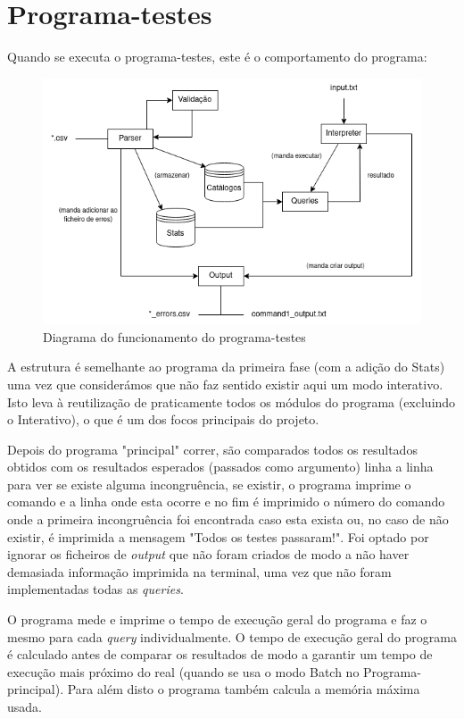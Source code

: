 \documentclass[12pt,a4paper]{report}
\begin{document}
    
    \chapter{Programa-testes}

    Quando se executa o programa-testes, este é o comportamento do programa:    
    
    \begin{figure}[h]
    \includegraphics[scale = 0.6]{Testes.png}
    \centering
    \caption{Diagrama do funcionamento do programa-testes}
    \end{figure} 

     A estrutura é semelhante ao programa da primeira fase (com a adição do Stats) uma vez que considerámos que não faz sentido existir aqui um modo interativo. Isto leva à reutilização de praticamente todos os módulos do programa (excluindo o Interativo), o que é um dos focos principais do projeto.

    Depois do programa "principal" correr, são comparados todos os resultados obtidos com os resultados esperados (passados como argumento) linha a linha para ver se existe alguma incongruência, se existir, o programa imprime o comando e a linha onde esta ocorre e no fim é imprimido o número do comando onde a primeira incongruência foi encontrada caso esta exista ou, no caso de não existir, é imprimida a mensagem "Todos os testes passaram!". Foi optado por ignorar os ficheiros de \textit{output} que não foram criados de modo a não haver demasiada informação imprimida na terminal, uma vez que não foram implementadas todas as \textit{queries}.
    
    O programa mede e imprime o tempo de execução geral do programa e faz o mesmo para cada \textit{query} individualmente. O tempo de execução geral do programa é calculado antes de comparar os resultados de modo a garantir um tempo de execução mais próximo do real (quando se usa o modo Batch no Programa-principal). Para além disto o programa também calcula a memória máxima usada.
\end{document}
